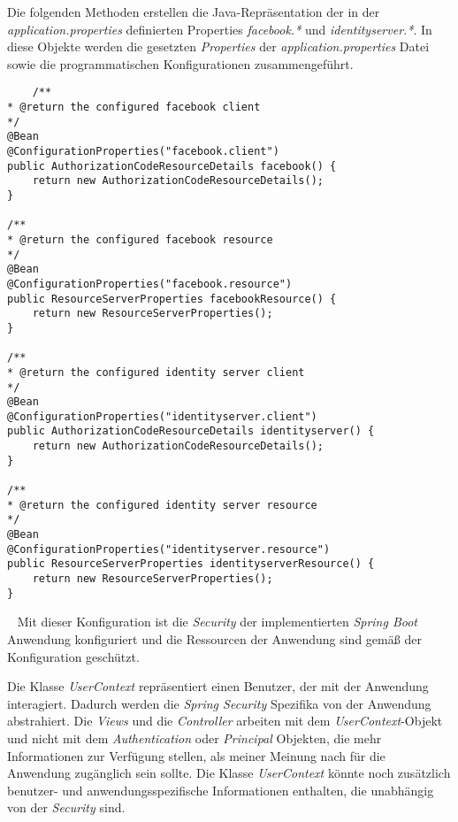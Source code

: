 Die folgenden Methoden erstellen die Java-Repräsentation der in der \emph{application.properties} definierten Properties \emph{facebook.*} und \emph{identityserver.*}. In diese Objekte werden die gesetzten \emph{Properties} der \emph{application.properties} Datei sowie die programmatischen Konfigurationen zusammengeführt.
\begin{verbatim}
    /**
* @return the configured facebook client
*/
@Bean
@ConfigurationProperties("facebook.client")
public AuthorizationCodeResourceDetails facebook() {
	return new AuthorizationCodeResourceDetails();
}

/**
* @return the configured facebook resource
*/
@Bean
@ConfigurationProperties("facebook.resource")
public ResourceServerProperties facebookResource() {
	return new ResourceServerProperties();
}

/**
* @return the configured identity server client
*/
@Bean
@ConfigurationProperties("identityserver.client")
public AuthorizationCodeResourceDetails identityserver() {
	return new AuthorizationCodeResourceDetails();
}

/**
* @return the configured identity server resource
*/
@Bean
@ConfigurationProperties("identityserver.resource")
public ResourceServerProperties identityserverResource() {
	return new ResourceServerProperties();
}
\end{verbatim}
\ \newline
Mit dieser Konfiguration ist die \emph{Security} der implementierten \emph{Spring Boot} Anwendung konfiguriert und die Ressourcen der Anwendung sind gemäß der Konfiguration geschützt.
\newpage

Die Klasse \emph{UserContext} repräsentiert einen Benutzer, der mit der Anwendung interagiert. Dadurch werden die \emph{Spring Security} Spezifika von der Anwendung abstrahiert. Die \emph{Views} und die \emph{Controller} arbeiten mit dem \emph{UserContext}-Objekt und nicht mit dem \emph{Authentication} oder \emph{Principal} Objekten, die mehr Informationen zur Verfügung stellen, als meiner Meinung nach für die Anwendung zugänglich sein sollte.
\newline\newline
Die Klasse \emph{UserContext} könnte noch zusätzlich benutzer- und anwendungsspezifische Informationen enthalten, die unabhängig von der \emph{Security} sind.  

